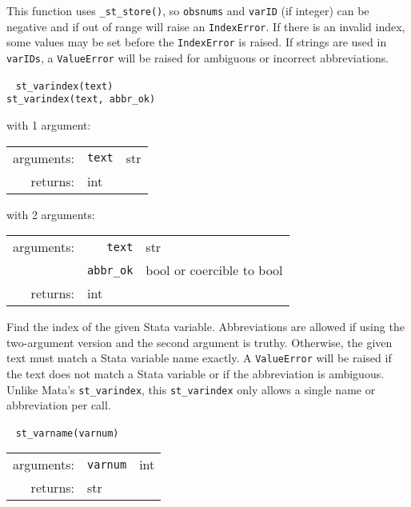 \documentclass{article}
\begin{document}
			This function uses \lstinline{_st_store()}, so \lstinline{obsnums} and \lstinline{varID} (if integer) can be negative and if out of range will raise an \lstinline{IndexError}. If there is an invalid index, some values may be set before the \lstinline{IndexError} is raised. If strings are used in \lstinline{varIDs}, a \lstinline{ValueError} will be raised for ambiguous or incorrect abbreviations. \newline
			
			
			\ \newline
			\noindent \lstinline$st_varindex(text)$ \\
			\noindent \lstinline$st_varindex(text, abbr_ok)$
								
			\vspace{1.5mm}
			\noindent 
			\indent with 1 argument:
			
			\indent \qquad \begin{tabular}{rrl}
					arguments: & \texttt{text} & str \\
					returns: & \multicolumn{2}{l}{int}
				\end{tabular}
								
			\vspace{1.5mm}
			\noindent 
			\indent with 2 arguments:
			
			\indent \qquad \begin{tabular}{rrl}
					arguments: & \texttt{text} & str \\
					  & \texttt{abbr\_ok} & bool or coercible to bool \\
					returns: & \multicolumn{2}{l}{int}
				\end{tabular}
								
			\vspace{1.5mm}
			\noindent Find the index of the given Stata variable. Abbreviations are allowed if using the two-argument version and the second argument is truthy. Otherwise, the given text must match a Stata variable name exactly. A \lstinline$ValueError$ will be raised if the text does not match a Stata variable or if the abbreviation is ambiguous. Unlike Mata's \lstinline{st_varindex}, this \lstinline{st_varindex} only allows a single name or abbreviation per call. \newline
			
			
			\ \newline
			\noindent \lstinline$st_varname(varnum)$
								
			\vspace{1.5mm}
			\noindent 
			\indent \begin{tabular}{rrl}
					arguments: & \texttt{varnum} & int \\
					returns: & \multicolumn{2}{l}{str}
				\end{tabular}
								
\end{document}
